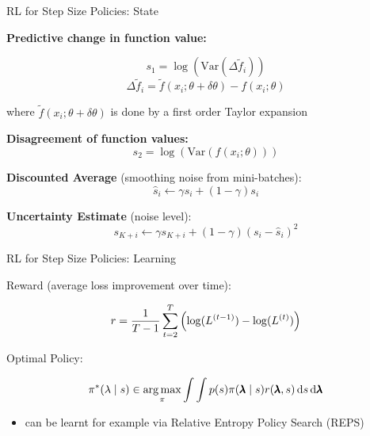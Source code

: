 \begin{frame}[c]{RL for Step Size Policies: State }

\textbf{Predictive change in function value:}

$$s_1 = \log \left( \text{Var}(\Delta \tilde{f}_i ) \right)$$
$$\Delta \tilde{f}_i = \tilde{f}(x_i; \theta + \delta \theta) - f(x_i; \theta)$$

where $\tilde{f}(x_i; \theta + \delta \theta)$ is done by a first order Taylor expansion

\pause
\smallskip
\textbf{Disagreement of function values:}
$$ s_2 = \log \left(\text{Var}(f(x_i; \theta)) \right)$$

\pause

\textbf{Discounted Average} (smoothing noise from mini-batches):
$$\hat{s}_i \leftarrow \gamma \hat{s_i} + (1 - \gamma) s_i$$

\pause

\textbf{Uncertainty Estimate} (noise level):
$$s_{K+i} \leftarrow \gamma s_{K+i} + (1-\gamma) (s_i - \hat{s}_i)^2$$


\end{frame}
\begin{frame}[c]{RL for Step Size Policies: Learning }

Reward (average loss improvement over time):

$$r = \frac{1}{T-1} \sum_{t=2}^T \left(\log(L^{(t-1)}) - \log(L^{(t)})\right)$$

\pause

Optimal Policy:

$$\pi^*(\lambda \mid s) \in \operatorname*{arg\,max}_{\pi} \int \int p(s) \pi(\pmb{\lambda} \mid s)r(\pmb{\lambda},s) \mathop{}\!\mathrm{d}s \mathop{}\!\mathrm{d}\pmb{\lambda} $$

\pause


\begin{itemize}
\item can be learnt for example via Relative Entropy Policy Search (REPS) 
\end{itemize}

\end{frame}

